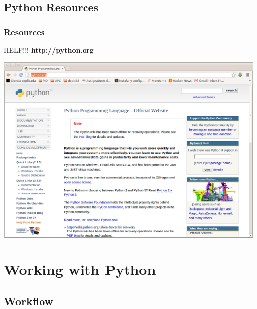 \documentclass[colorlinks]{beamer}
\begin{document}
\subsection{Python Resources}
\begin{frame}[fragile]\frametitle{Resources}
\begin{block}{HELP!!!}
\textbf{http://python.org}
\begin{center}
\includegraphics[scale=0.15]{figs/python__org.jpg}
\end{center}  
\end{block}
  
\end{frame}

\section{Working with Python}

\subsection{Workflow}
\end{document}
